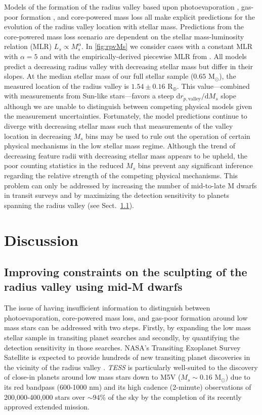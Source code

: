 \documentclass[twocolumn]{emulateapj}
\newcommand{\tess}[1]{\emph{TESS}#1}
\begin{document}
Models of the formation of the radius valley based upon photoevaporation \citep{wu19}, gas-poor formation \citep{lopez18},
and core-powered mass loss \citep{gupta19b} all make explicit predictions for the evolution of the radius valley location
with stellar mass. Predictions from the core-powered mass loss scenario are dependent on the stellar mass-luminosity
relation (MLR) $L_s \propto M_s^{\alpha}$. In \autoref{fig:rpvMs} we consider cases with a constant MLR with $\alpha=5$
\citep{gupta19b} and with the empirically-derived piecewise MLR from \cite{eker18}. All models predict a decreasing
radius valley with decreasing stellar mass but differ in their slopes. 
At the median stellar mass of our full stellar sample ($0.65$ M$_{\odot}$), the measured location of the radius valley is
$1.54\pm 0.16$ R$_{\oplus}$. This value---combined with measurements from Sun-like stars---favors
a steep $\text{d}r_{p,\text{valley}} / \text{d}M_s$ slope although we are
unable to distinguish between competing physical models given the measurement uncertainties.
Fortunately, the model predictions continue to diverge
with decreasing stellar mass such that measurements of the valley location in decreasing $M_s$ bins may be used to
rule out the operation of certain physical mechanisms in the low stellar mass regime. Although the trend of decreasing
feature radii with decreasing stellar mass appears to be upheld, the poor counting statistics in the reduced
$M_s$ bins prevent any significant inference regarding the relative strength of the competing physical mechanisms.
This problem can only be addressed by increasing the number of mid-to-late M dwarfs in transit surveys and by maximizing
the detection sensitivity to planets spanning the radius valley (see Sect.~\ref{sect:improve}).


\section{Discussion} \label{sect:discussion}
\subsection{Improving constraints on the sculpting of the radius valley using mid-M dwarfs} \label{sect:improve}
The issue of having insufficient information to distinguish between photoevaporation, core-powered mass loss, and gas-poor
formation around low mass stars can be addressed with two steps. Firstly, by expanding the low mass stellar sample in 
transiting planet searches and secondly, by quantifying the detection sensitivity in those searches. 
NASA's Transiting Exoplanet Survey Satellite \citep[\tess{;}][]{ricker15} is expected to provide hundreds of new transiting
planet discoveries in the vicinity of the radius valley \citep{barclay18}. \tess{} is particularly well-suited to the discovery of
close-in planets around low mass stars down to M5V ($M_s\sim 0.16$ M$_{\odot}$) due to its red bandpass (600-1000 nm)
and its high cadence (2-minute) observations of 200,000-400,000 stars over $\sim 94$\% of the sky by the completion of its
recently approved extended mission.
\end{document}
